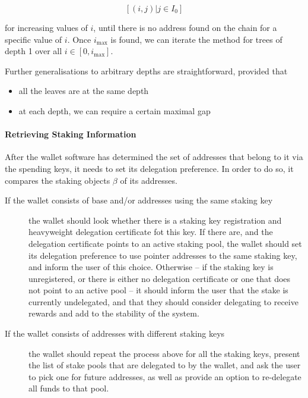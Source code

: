 \documentclass[11pt,a4paper]{article}
\begin{document}
\[
[(i, j) | j \in I_0]
\]

for increasing values of \(i\), until there is no address found on the
chain for a specific value of \(i\). Once \(i_\text{max}\) is found, we
can iterate the method for trees of depth 1 over all
\(i \in [0, i_\text{max}]\).

Further generalisations to arbitrary depths are straightforward,
provided that

\begin{itemize}
\item
  all the leaves are at the same depth
\item
  at each depth, we can require a certain maximal gap
\end{itemize}

\paragraph{Retrieving Staking Information}
\label{retrieving-staking-information}

After the wallet software has determined the set of addresses that
belong to it via the spending keys, it needs to set its delegation
preference. In order to do so, it compares the staking objects \(\beta\)
of its addresses.

\begin{description}
\item[If the wallet consists of base and/or addresses using the same
  staking key] the wallet should look whether there is a staking key
  registration and heavyweight delegation certificate fot this key. If
  there are, and the delegation certificate points to an active
  staking pool, the wallet should set its delegation preference to use
  pointer addresses to the same staking key, and inform the user of
  this choice. Otherwise -- if the staking key is unregistered, or
  there is either no delegation certificate or one that does not point
  to an active pool -- it should inform the user that the stake is
  currently undelegated, and that they should consider delegating to
  receive rewards and add to the stability of the system.

\item[If the wallet consists of addresses with different staking keys]
  the wallet should repeat the process above for all the staking keys,
  present the list of stake pools that are delegated to by the wallet,
  and ask the user to pick one for future addresses, as well as
  provide an option to re-delegate all funds to that pool.
\end{description}
\end{document}
